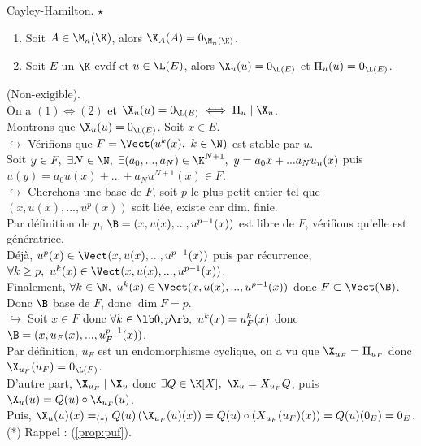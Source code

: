 \documentclass[11pt]{article}
\begin{document}
\begin{thm}{Cayley-Hamilton. $\star$}{}
    \begin{enumerate}
        \item Soit $A\in \M_n(\K)$, alors $\X_A(A)=0_{\M_n(\K)}$.
        \item Soit $E$ un $\K$-evdf et $u\in\L(E)$, alors $\X_u(u)=0_{\L(E)}$ et $\Pi_u(u)=0_{\L(E)}$.
    \end{enumerate}
    \vspace*{0.25cm}
    \begin{center}
    \end{center}
    \tcblower
    (Non-exigible).\\
    On a $(1) \iff (2)$ et $\X_u(u) = 0_{\L(E)} \iff \Pi_u \mid \X_u$.\\
    Montrons que $\X_u(u) = 0_{\L(E)}$. Soit $x\in E$.\\
    $\hookrightarrow$ Vérifions que $F=\Vect(u^k(x), ~ k\in\N)$ est stable par $u$.\\
    Soit $y \in F,~\exists N \in \N, ~ \exists (a_0, ..., a_N) \in \K^{N+1}, ~ y = a_0x + ... a_Nu_n(x)$ puis $u(y)=a_0u(x)+...+a_Nu^{N+1}(x)\in F$.\\
    $\hookrightarrow$ Cherchons une base de $F$, soit $p$ le plus petit entier tel que $(x, u(x), ..., u^p(x))$ soit liée, existe car dim. finie.\\
    Par définition de $p$, $\B=(x,u(x),...,u^{p-1}(x))$ est libre de $F$, vérifions qu'elle est génératrice.\\
    Déjà, $u^p(x)\in\Vect(x,u(x),...,u^{p-1}(x))$ puis par récurrence, $\forall k \geq p, ~ u^k(x) \in \Vect(x,u(x),...,u^{p-1}(x))$.\\
    Finalement, $\forall k \in \N, ~ u^k(x) \in \Vect(x, u(x), ..., u^{p-1}(x))$ donc $F\subset\Vect(\B)$. Donc $\B$ base de $F$, donc $\dim F = p$.\\
    $\hookrightarrow$ Soit $x\in F$ donc $\forall k \in \lb0,p\rb, ~ u^k(x)=u^k_F(x)$ donc $\B=(x,u_F(x),...,u_F^{p-1}(x))$.\\
    Par définition, $u_F$ est un endomorphisme cyclique, on a vu que $\X_{u_F}=\Pi_{u_F}$ donc $\X_{u_F}(u_F)=0_{\L(F)}$.\\
    D'autre part, $\X_{u_F} \mid \X_u$ donc $\exists Q \in \K[X], ~ \X_u = X_{u_F}Q$, puis $\X_u(u)=Q(u)\circ \X_{u_F}(u)$.\\
    Puis, $\X_u(u)(x)=_{(*)}Q(u)\left( \X_{u_F}(u)(x) \right)=Q(u) \circ \left(X_{u_F}(u_F)(x)\right) = Q(u)(0_E) = 0_E$.\\
    (*) Rappel : (\ref{prop:puf}).
\end{thm}
\end{document}
